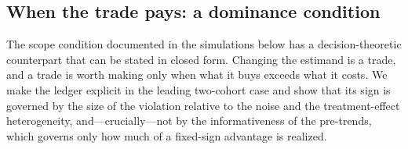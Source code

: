
\subsection{When the trade pays: a dominance condition}\label{sec:dominance}

The scope condition documented in the simulations below has a decision-theoretic
counterpart that can be stated in closed form. Changing the estimand is a trade, and
a trade is worth making only when what it buys exceeds what it costs. We make the
ledger explicit in the leading two-cohort case and show that its sign is governed by
the size of the violation relative to the noise and the treatment-effect
heterogeneity, and---crucially---not by the informativeness of the pre-trends, which
governs only how much of a fixed-sign advantage is realized.

